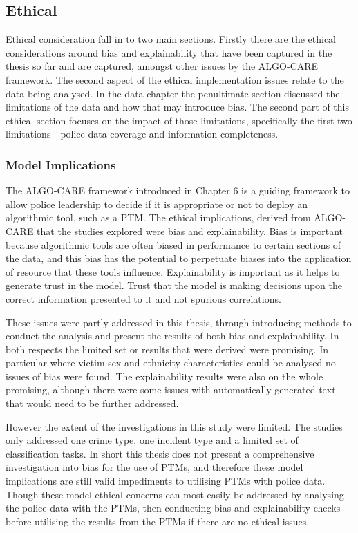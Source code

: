 \subsection{Ethical} Ethical consideration fall in to two main sections. Firstly there are the ethical considerations around bias and explainability that have been captured in the thesis so far and are captured, amongst other issues by the ALGO-CARE framework. The second aspect of the ethical implementation issues relate to the data being analysed. In the data chapter the penultimate section discussed the limitations of the data and how that may introduce bias. The second part of this ethical section focuses on the impact of those limitations, specifically the first two limitations - police data coverage and information completeness.

\subsubsection{Model Implications}  The ALGO-CARE framework introduced in Chapter 6 is a guiding framework to allow police leadership to decide if it is appropriate or not to deploy an algorithmic tool, such as a PTM. The ethical implications, derived from ALGO-CARE that the studies explored were bias and explainability. Bias is important because algorithmic tools are often biased in performance to certain sections of the data, and this bias has the potential to perpetuate biases into the application of resource that these tools influence. Explainability is important as it helps to generate trust in the model. Trust that the model is making decisions upon the correct information presented to it and not spurious correlations.  

These issues were partly addressed in this thesis, through introducing methods to conduct the analysis and present the results of both bias and explainability. In both respects the limited set or results that were derived were promising. In particular where victim sex and ethnicity characteristics could be analysed no issues of bias were found. The explainability results were also on the whole promising, although there were some issues with automatically generated text that would need to be further addressed.

However the extent of the investigations in this study were limited. The studies only addressed one crime type, one incident type and a limited set of classification tasks. In short this thesis does not present a comprehensive investigation into bias for the use of PTMs, and therefore these model implications are still valid impediments to utilising PTMs with police data. Though these model ethical concerns can most easily be addressed by analysing the police data with the PTMs, then conducting bias and explainability checks before utilising the results from the PTMs if there are no ethical issues. 

